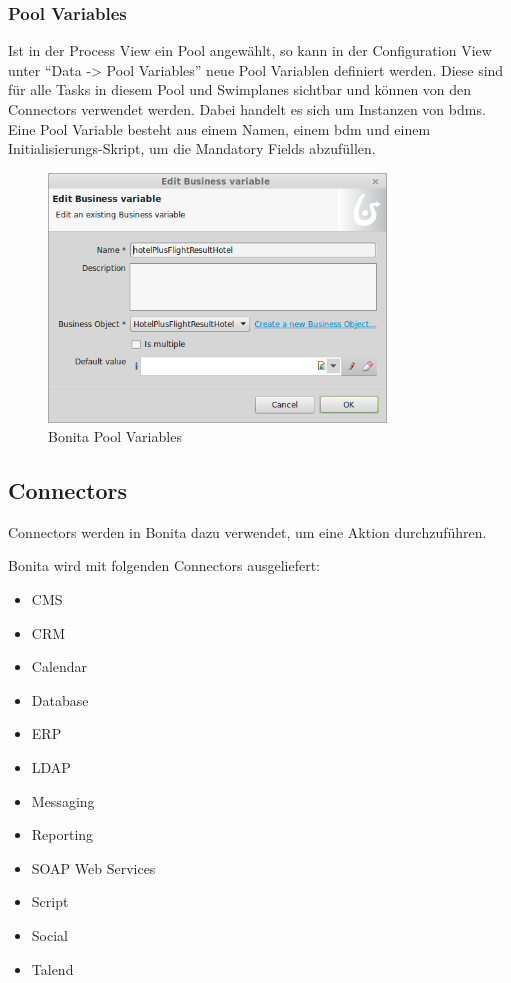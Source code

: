 \subsubsection{Pool Variables}
Ist in der Process View ein Pool angewählt, so kann in der Configuration View unter "`Data -> Pool Variables"' neue Pool Variablen definiert werden. Diese sind für alle Tasks in diesem Pool und Swimplanes sichtbar und können von den Connectors verwendet werden. Dabei handelt es sich um Instanzen von \glspl{bdm}. Eine Pool Variable besteht aus einem Namen, einem \gls{bdm} und einem Initialisierungs-Skript, um die Mandatory Fields abzufüllen.
\begin{figure}[H]
	\centering
	\includegraphics[width=0.8\textwidth]{images/bonita-poolvariables.png}
	\caption{Bonita Pool Variables}
	\label{fig:analyse:bonita:bpm:poolvariables}
\end{figure}

\subsection{Connectors}
\label{sec:analyse:bonita:connectors}
Connectors werden in Bonita dazu verwendet, um eine Aktion durchzuführen. 

Bonita wird mit folgenden Connectors ausgeliefert:
\begin{itemize}
\item CMS
\item CRM
\item Calendar
\item Database
\item ERP
\item LDAP
\item Messaging
\item Reporting
\item SOAP Web Services
\item Script
\item Social
\item Talend
\end{itemize}

